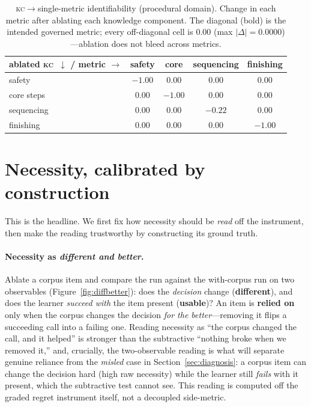 \documentclass{article}
\newcommand{\kc}{\textsc{kc}}
\begin{document}
\begin{table}[t]
\centering
\small
\begin{tabular}{@{}lcccc@{}}
\toprule
ablated \kc\ $\downarrow$ / metric $\rightarrow$ & safety & core & sequencing & finishing \\
\midrule
safety      & $\mathbf{-1.00}$ & $0.00$ & $0.00$ & $0.00$ \\
core steps  & $0.00$ & $\mathbf{-1.00}$ & $0.00$ & $0.00$ \\
sequencing  & $0.00$ & $0.00$ & $\mathbf{-0.22}$ & $0.00$ \\
finishing   & $0.00$ & $0.00$ & $0.00$ & $\mathbf{-1.00}$ \\
\bottomrule
\end{tabular}
\caption{\kc$\to$single-metric identifiability (procedural domain). Change in each metric after
ablating each knowledge component. The diagonal (bold) is the intended governed metric; every
off-diagonal cell is $0.00$ (max $|\Delta|=0.0000$)---ablation does not bleed across metrics.}
\label{tab:ident}
\end{table}

\section{Necessity, calibrated by construction}
\label{sec:necessity}
This is the headline. We first fix how necessity should be \emph{read} off the instrument, then make
the reading trustworthy by constructing its ground truth.

\paragraph{Necessity as \emph{different and better}.} Ablate a corpus item and compare the run against
the with-corpus run on two observables (Figure~\ref{fig:diffbetter}): does the \emph{decision} change
(\textbf{different}), and does the learner \emph{succeed with} the item present (\textbf{usable})? An
item is \textbf{relied on} only when the corpus changes the decision \emph{for the better}---removing
it flips a succeeding call into a failing one. Reading necessity as ``the corpus changed the call, and
it helped'' is stronger than the subtractive ``nothing broke when we removed it,'' and, crucially, the
two-observable reading is what will separate genuine reliance from the \emph{misled} case in
Section~\ref{sec:diagnosis}: a corpus item can change the decision hard (high raw necessity) while the
learner still \emph{fails} with it present, which the subtractive test cannot see. This reading is
computed off the graded regret instrument itself, not a decoupled side-metric.
\end{document}
